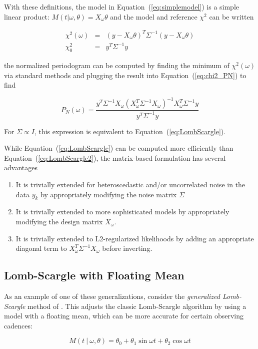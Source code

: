 \documentclass[12pt,preprint]{aastex}
\newcommand{\Eq}[1]{Equation~(\ref{eq:#1})}
\newcommand{\eq}[1]{\Eq{#1}}
\newcommand{\eqlabel}[1]{\label{eq:#1}}
\begin{document}
With these definitions, the model in \eq{simplemodel} is a simple linear product: $M(t|\omega,\theta) = X_\omega\theta$ and the model and reference $\chi^2$ can be written

\begin{eqnarray}
  \chi^2(\omega) &=& (y - X_\omega\theta)^T\Sigma^{-1}(y - X_\omega\theta)\\
  \chi^2_0 &=& y^T \Sigma^{-1} y
\end{eqnarray}

the normalized periodogram can be computed by finding the minimum of $\chi^2(\omega)$ via standard methods and plugging the result into \eq{chi2_PN} to find

\begin{equation}
  \eqlabel{LombScargle2}
  P_N(\omega) = \frac{y^T\Sigma^{-1}X_\omega(X_\omega^T\Sigma^{-1}X_\omega)^{-1}X_\omega^T\Sigma^{-1}y}{y^T\Sigma^{-1}y}
\end{equation}

For $\Sigma \propto I$, this expression is equivalent to \eq{LombScargle}.

While \eq{LombScargle} can be computed more efficiently than \eq{LombScargle2}, the matrix-based formulation has several advantages
\begin{enumerate}
  \item It is trivially extended for heteroscedastic and/or uncorrelated noise in the data $y_k$ by appropriately modifying the noise matrix $\Sigma$
  \item It is trivially extended to more sophisticated models by appropriately modifying the design matrix $X_\omega$.
  \item It is trivially extended to L2-regularized likelihoods by adding an appropriate diagonal term to $X_\omega^T\Sigma^{-1}X_\omega$ before inverting.
\end{enumerate}

\subsection{Lomb-Scargle with Floating Mean}

As an example of one of these generalizations, consider the {\it generalized Lomb-Scargle} method of \citep{Zechmeister09}. This adjusts the classic Lomb-Scargle algorithm by using a model with a floating mean, which can be more accurate for certain observing cadences:

\begin{equation}
  M(t~|~\omega, \theta) = \theta_0 + \theta_1\sin\omega t + \theta_2\cos\omega t
\end{equation}
\end{document}
